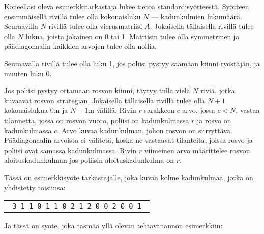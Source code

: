 \documentclass{boi2014-fi}
\begin{document}
    \Experimentation
    Koneellasi oleva esimerkkitarkastaja lukee tietoa standardisyötteestä.
    Syötteen ensimmäisellä rivillä tulee olla kokonaisluku $N$ ---
    kadunkulmien lukumäärä. Seuraavilla $N$ rivillä tulee olla
    vierusmatriisi $A$. Jokaisella tällaisella rivillä tulee olla $N$ lukua,
    joista jokainen on 0 tai 1.
    Matriisin tulee olla symmetrinen ja päädiagonaalin kaikkien arvojen
    tulee olla nollia.

    Seuraavalla rivillä tulee olla luku 1, jos poliisi pystyy saamaan kiinni ryöstäjän,
    ja muuten luku 0.

    Jos poliisi pystyy ottamaan rosvon kiinni, täytyy tulla vielä $N$ riviä,
    jotka kuvaavat rosvon strategian.
    Jokaisella tällaisella rivillä tulee olla $N+1$ kokonaislukua 0:n ja $N-1$:n välillä.
    Rivin $r$ sarakkeen $c$ arvo, jossa $c < N$, vastaa tilannetta,
    jossa on rosvon vuoro, poliisi on kadunkulmassa $r$ ja rosvo on
    kadunkulmassa $c$. Arvo kuvaa kadunkulman, johon rosvon on siirryttävä.
    Päädiagonaalin arvoista ei välitetä, koska ne vastaavat tilanteita,
    joissa rosvo ja poliisi ovat samassa kadunkulmassa.
    Rivin $r$ viimeinen arvo määrittelee rosvon aloituskadunkulman jos poliisin
    aloituskadunkulma on $r$.

    Tässä on esimerkkisyöte tarkastajalle, joka kuvaa kolme kadunkulmaa,
    jotka on yhdistetty toisiinsa:

    \begin{center}
        \begin{tabular}{p{4cm}}
            {\tt
                3 \newline
                0 1 1 \newline
                1 0 1 \newline
                1 1 0 \newline
                1 \newline
                0 2 1 2 \newline
                2 0 0 2 \newline
                1 0 0 1 \newline
            }
        \end{tabular}
    \end{center}

    Ja tässä on syöte, joka täsmää yllä olevan tehtävänannon esimerkkiin:
\end{document}

